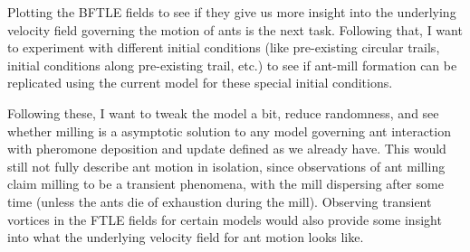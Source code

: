 Plotting the BFTLE fields to see if they give us more insight into the underlying velocity field governing the motion of ants is the next task. Following that, I want to experiment with different initial conditions (like pre-existing circular trails, initial conditions along pre-existing trail, etc.) to see if ant-mill formation can be replicated using the current model for these special initial conditions. 

Following these, I want to tweak the model a bit, reduce randomness, and see whether milling is a asymptotic solution to any model governing ant interaction with pheromone deposition and update defined as we already have. This would still not fully describe ant motion in isolation, since observations of ant milling claim milling to be a transient phenomena, with the mill dispersing after some time (unless the ants die of exhaustion during the mill). Observing transient vortices in the FTLE fields for certain models would also provide some insight into what the underlying velocity field for ant motion looks like.